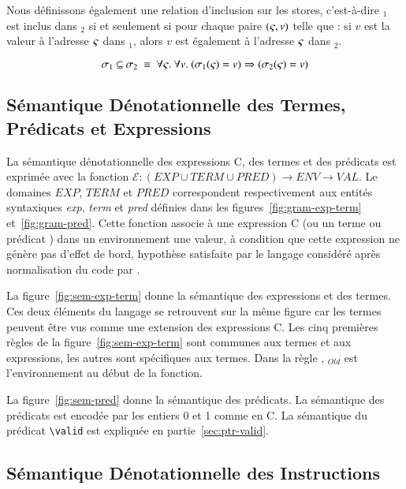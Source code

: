 Nous définissons également une relation d'inclusion sur les stores, c'est-à-dire
\store$_1$ est inclus dans \store$_2$ si et seulement si pour chaque
paire $(\varsigma, v)$ telle que : si $v$ est la valeur à l'adresse $\varsigma$
dans \store$_1$, alors $v$ est également à l'adresse $\varsigma$ dans \store$_2$.

\[
\mbox{$\sigma$}_1~\mbox{$\subseteq$}~\mbox{$\sigma$}_2~\equiv~
\forall \varsigma.~\forall v.
~(\mbox{$\sigma$}_1(\varsigma)=v) \Rightarrow (\mbox{$\sigma$}_2(\varsigma)=v)
\]

\subsection{Sémantique Dénotationnelle des Termes, Prédicats et Expressions}



La sémantique dénotationnelle des expressions C, des termes et des prédicats
\eacsl est exprimée avec la fonction
$\mathcal{E} : (EXP \cup TERM \cup PRED) \rightarrow ENV \rightarrow VAL$.
Le domaines $EXP$, $TERM$ et $PRED$ correspondent respectivement aux entités
syntaxiques \textit{exp}, \textit{term} et \textit{pred} définies dans les
figures~\ref{fig:gram-exp-term} et~\ref{fig:gram-pred}.
Cette fonction associe à une expression C (ou un terme ou prédicat \eacsl) dans
un environnement une valeur, à condition que cette expression ne génère pas
d'effet de bord, hypothèse satisfaite par le langage considéré après
normalisation du code par \framac.

La figure~\ref{fig:sem-exp-term} donne la sémantique des expressions et des
termes.
Ces deux éléments du langage se retrouvent sur la même figure car les termes
peuvent être vus comme une extension des expressions C.
Les cinq premières règles de la figure~\ref{fig:sem-exp-term} sont communes aux
termes et aux expressions, les autres sont spécifiques aux termes.
Dans la règle , \env$_{Old}$ est l'environnement au début de la
fonction.

La figure~\ref{fig:sem-pred} donne la sémantique des prédicats.
La sémantique des prédicats est encodée par les entiers 0 et 1 comme en C.
La sémantique du prédicat \lstinline'\valid' est expliquée en
partie~\ref{sec:ptr-valid}.




\subsection{Sémantique Dénotationnelle des Instructions}

